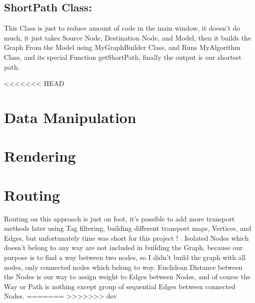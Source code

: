 \documentclass[a4paper, 12pt, english]{book}
\begin{document}
\subsection{ ShortPath Class:}
This Class is just to reduce amount of code in the main window, it doesn’t do much, it just takes Source Node, Destination Node, and Model, then it builds the Graph From the Model using MyGraphBuilder Class, and Runs MyAlgorithm Class, and its special Function getShortPath, finally the output is our shortest path.



<<<<<<< HEAD
\section{Data Manipulation}

\section{Rendering}

\section{Routing}
Routing on this approach is just on foot, it’s possible to add more transport methods later using Tag filtering, building different transport maps, Vertices, and Edges, but unfortunately time was short for this project ! .
Isolated Nodes which doesn’t belong to any way are not included in building the Graph, because our purpose is to find a way between two nodes, so I didn’t build the graph with all nodes, only connected nodes which belong to way.
Euclidean Distance between the Nodes is our way to assign weight to Edges between Nodes, and of course the Way or Path is nothing except group of sequential Edges between connected Nodes.
=======
>>>>>>> dev
\end{document}
